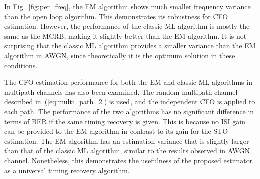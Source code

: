 \documentclass[12pt, draftclsnofoot, onecolumn]{IEEEtran}
\begin{document}
In Fig.~\ref{fig:per_freq}, the EM algorithm shows much smaller frequency variance than the open loop algorithm. 
This demonstrates its robustness for CFO estimation.
However, the performance of the classic ML algorithm is mostly the same as the MCRB, making it slightly better than the EM algorithm.
It is not surprising that the classic ML algorithm provides a smaller variance than the EM algorithm in AWGN, since theoretically it is the optimum solution in these conditions. 

The CFO estimation performance for both the EM and classic ML algorithms in multipath channels has also been examined.
The random multipath channel described in~(\ref{eq:multi_path_2}) is used,
and the independent CFO is applied to each path.
The performance of the two algorithms has no significant difference in terms of BER if the same timing recovery is given.
This is because no ISI gain can be provided to the EM algorithm in contrast to its gain for the STO estimation.
The EM algorithm has an estimation variance that is slightly larger than that of the classic ML algorithm, similar to the results observed in AWGN channel.
Nonetheless, this demonstrates the usefulness of the proposed estimator as a universal timing recovery algorithm.
% 
% 
\end{document}
